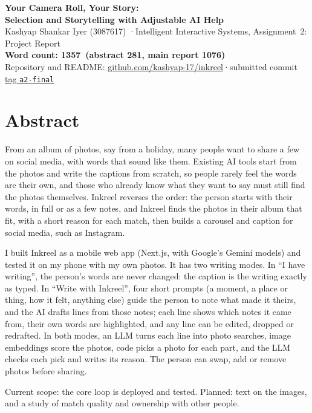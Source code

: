 \documentclass[11pt,a4paper]{article}
\newcommand{\abstractcount}{281}
\newcommand{\maincount}{1076}
\newcommand{\totalcount}{1357}
\newcommand{\repo}{\href{https://github.com/kashyap-17/inkreel}{github.com/kashyap-17/inkreel}}
\newcommand{\commit}{\href{https://github.com/kashyap-17/inkreel/tree/a2-final}{tag \texttt{a2-final}}}
\begin{document}
\begin{center}
  {\sffamily\Large\bfseries Your Camera Roll, Your Story:\\
  Selection and Storytelling with Adjustable AI Help}\\[1ex]
  {\sffamily Kashyap Shankar Iyer (3087617) \quad·\quad Intelligent Interactive Systems,
  Assignment~2: Project Report}\\[0.6ex]
  {\sffamily\bfseries Word count: \totalcount\ (abstract \abstractcount, main report \maincount)}\\[0.4ex]
  {\sffamily\small Repository and README: \repo \quad·\quad submitted commit \commit}
\end{center}

\section{Abstract}

From an album of photos, say from a holiday, many people want to share a few on social media,
with words that sound like them. Existing AI tools start from the photos and write the captions
from scratch, so people rarely feel the words are their own, and those who already know what they
want to say must still find the photos themselves. Inkreel reverses the order: the person starts
with their words, in full or as a few notes, and Inkreel finds the photos in their album that fit, with a short reason
for each match, then builds a carousel and caption for social media, such as Instagram.

I built Inkreel as a mobile web app (Next.js, with Google's Gemini models) and tested
it on my phone with my own photos. It has two writing modes. In ``I have writing'', the
person's words are never changed: the caption is the writing exactly as typed. In ``Write with
Inkreel'', four short prompts (a moment, a place or thing, how it felt, anything else) guide the
person to note what made it theirs, and the AI drafts lines from those notes; each line
shows which notes it came from, their own words are highlighted, and any line can be
edited, dropped or redrafted. In both modes, an LLM turns each line into photo searches,
image embeddings score the photos, code picks a photo for each part, and
the LLM checks each pick and writes its reason. The person can swap, add or remove photos before sharing.

Current scope: the core loop is deployed and tested. Planned: text on the
images, and a study of match quality and ownership with other people.
\end{document}
